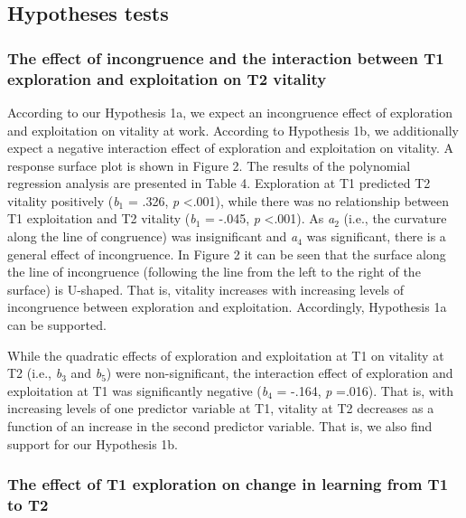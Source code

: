 \documentclass[man, 12pt, a4paper, noextraspace]{apa6}
\begin{document}
\subsection{Hypotheses tests}
\subsubsection{The effect of incongruence and the interaction between T1 exploration and exploitation on T2 vitality}
According to our Hypothesis 1a, we expect an incongruence effect of exploration and exploitation on vitality at work.
According to Hypothesis 1b, we additionally expect a negative interaction effect of exploration and exploitation on vitality.
A response surface plot is shown in Figure 2. 
The results of the polynomial regression analysis are presented in Table 4. 
Exploration at T1 predicted T2 vitality positively (\textit{b}$_1$ = .326, \textit{p} <.001), while there was no relationship between T1 exploitation and T2 vitality (\textit{b}$_1$ = -.045, \textit{p} <.001). 
As \textit{a}$_2$ (i.e., the curvature along the line of congruence) was insignificant and \textit{a}$_4$ was significant, there is a general effect of incongruence. 
In Figure 2 it can be seen that the surface along the line of incongruence (following the line from the left to the right of the surface) is U-shaped.
That is, vitality increases with increasing levels of incongruence between exploration and exploitation. 
Accordingly, Hypothesis 1a can be supported. \par 

While the quadratic effects of exploration and exploitation at T1 on vitality at T2 (i.e., \textit{b}$_3$ and \textit{b}$_5$) were non-significant, the interaction effect of exploration and exploitation at T1 was significantly negative (\textit{b}$_4$ = -.164, \textit{p} =.016).
That is, with increasing levels of one predictor variable at T1, vitality at T2 decreases as a function of an increase in the second predictor variable. 
That is, we also find support for our Hypothesis 1b. 

\subsubsection{The effect of T1 exploration on change in learning from T1 to T2}
\end{document}
